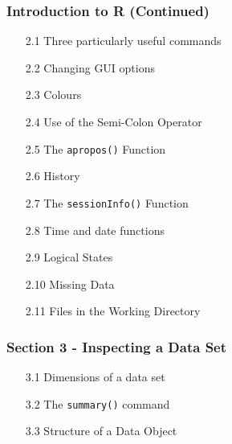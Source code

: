 \documentclass{beamer}
\begin{document}
 	\begin{frame}
 		\frametitle{Introduction to R (Continued) }
 		\begin{itemize}
 			\item[2.1] Three particularly useful commands    
 			\item[2.2] Changing GUI options     
 			\item[2.3] Colours      
 			\item[2.4] Use of the Semi-Colon Operator     
 			\item[2.5] The \texttt{apropos()} Function     
 			\item[2.6] History       
 			\item[2.7] The \texttt{sessionInfo()} Function     
 			\item[2.8] Time and date functions     
 			\item[2.9] Logical States      
 			\item[2.10] Missing Data      
 			\item[2.11] Files in the Working Directory     
 		\end{itemize}
 	\end{frame}
 	\begin{frame}
 		\frametitle{Section 3 - Inspecting a Data Set }
 		\begin{itemize}
 			\item[3.1] Dimensions of a data set 
 			\item[3.2] The \texttt{summary()} command   
 			\item[3.3] Structure of a Data Object 
 		\end{itemize}
 	\end{frame}
 	
\end{document}
